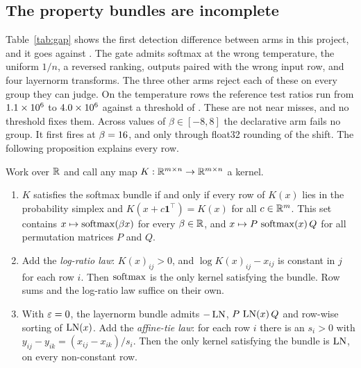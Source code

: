 \subsection{The property bundles are incomplete}
\label{sec:incomplete}

Table~\ref{tab:gap} shows the first detection difference between arms in this project,
and it goes against \DeclArm. The gate admits softmax at the wrong temperature, the
uniform $1/n$, a reversed ranking, outputs paired with the wrong input row, and four
layernorm transforms. The three other arms reject each of these on every group they can
judge. On the temperature rows the reference test ratios run from $1.1\times10^{6}$ to
$4.0\times10^{6}$ against a threshold of . These are not near misses, and no
threshold fixes them. Across
\betaSweepValues{} values of $\beta \in [-8, 8]$ the declarative arm fails no group. It
first fires at $\beta = 16$, and only through float32 rounding of the
shift. The following proposition explains every row.

\begin{proposition}
\label{prop:softmax}
Work over $\mathbb{R}$ and call any map $K:\mathbb{R}^{m\times n}\to\mathbb{R}^{m\times n}$ a kernel.
\begin{enumerate}
  \item[(a)] $K$ satisfies the softmax bundle if and only if every row of $K(x)$ lies in
    the probability simplex and $K(x + c\mathbf 1^\top) = K(x)$ for all $c\in\mathbb{R}^m$. This set
    contains $x \mapsto \operatorname{softmax}(\beta x)$ for every $\beta\in\mathbb{R}$, and
    $x \mapsto P\,\operatorname{softmax}(x)\,Q$ for all permutation matrices $P$ and $Q$.
  \item[(b)] Add the \emph{log-ratio law}: $K(x)_{ij} > 0$, and
    $\log K(x)_{ij} - x_{ij}$ is constant in $j$ for each row $i$. Then $\operatorname{softmax}$ is
    the only kernel satisfying the bundle. Row sums and the log-ratio law suffice on
    their own.
  \item[(c)] With $\varepsilon = 0$, the layernorm bundle admits $-\operatorname{LN}$, $P\,\operatorname{LN}(x)\,Q$ and
    row-wise sorting of $\operatorname{LN}(x)$. Add the \emph{affine-tie law}: for each row $i$ there is
    an $s_i > 0$ with $y_{ij} - y_{ik} = (x_{ij} - x_{ik})/s_i$. Then the only kernel
    satisfying the bundle is $\operatorname{LN}$, on every non-constant row.
\end{enumerate}
\end{proposition}


